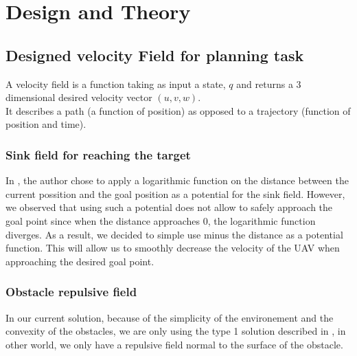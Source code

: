 \section{Design and Theory}
\subsection{Designed velocity Field for planning task}
A velocity field is a function taking as input a state, $q$ and returns a 3 dimensional desired velocity vector $(u,v,w)$.\\ It describes a path (a function of position) as opposed to a trajectory (function of position and time).
\subsubsection{Sink field for reaching the target}
In \cite{mcinnes2003velocity}, the author chose to apply a logarithmic function on the distance between the current possition and the goal position as a potential for the sink field. 
However, we observed that using such a potential does not allow to safely approach the goal point since when the distance approaches 0, the logarithmic function diverges.
As a result, we decided to simple use minus the distance as a potential function. This will allow us to smoothly decrease the velocity of the UAV when approaching the desired goal point.
\subsubsection{Obstacle repulsive field}
In our current solution, because of the simplicity of the environement and the convexity of the obstacles, we are only using the type 1 solution described in \cite{mcinnes2003velocity}, in other world, we only have a repulsive field normal to the surface of the obstacle.
